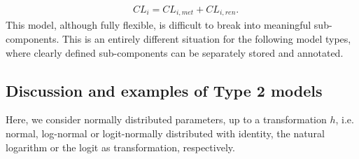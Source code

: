\begin{align*}
& CL_i = CL_{i,met} + CL_{i,ren}.
\end{align*}
This model, although fully flexible, is difficult to break into meaningful sub-components. This is an entirely different situation for the following model types, where clearly defined sub-components can be separately stored and annotated.

\subsection{Discussion and examples of Type 2 models}
\label{subsec:paramModelType2}
Here, we consider normally distributed parameters, up to a transformation $h$, i.e. normal, log-normal or logit-normally distributed with identity, the natural logarithm or the logit as transformation, respectively.

